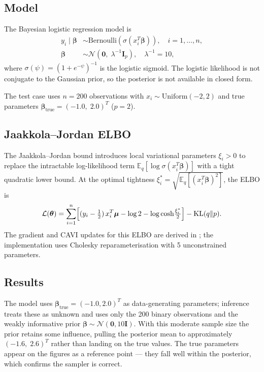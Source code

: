 \documentclass[11pt,a4paper]{article}
\newcommand{\E}{\mathbb{E}}
\newcommand{\N}{\mathcal{N}}
\begin{document}
\subsection{Model}

The Bayesian logistic regression model is
\begin{align}
  y_i \mid \bm{\beta} &\sim \mathrm{Bernoulli}(\sigma(x_i^T\bm{\beta})),
  \quad i = 1,\ldots,n, \\
  \bm{\beta} &\sim \N(\bm{0},\; \lambda^{-1}\bm{I}_p),
  \quad \lambda^{-1} = 10,
\end{align}
where $\sigma(\psi) = (1+e^{-\psi})^{-1}$ is the logistic sigmoid.
The logistic likelihood is not conjugate to the Gaussian prior, so the posterior is not
available in closed form.

The test case uses $n=200$ observations with $x_i \sim \mathrm{Uniform}(-2,2)$ and
true parameters $\bm{\beta}_{\mathrm{true}} = (-1.0,\; 2.0)^T$ ($p=2$).

\subsection{Jaakkola--Jordan ELBO}

The Jaakkola--Jordan bound \parencite{Jaakkola2000} introduces local variational
parameters $\xi_i > 0$ to replace the intractable log-likelihood term
$\E_q[\log\sigma(x_i^T\bm{\beta})]$ with a tight quadratic lower bound.
At the optimal tightness $\xi_i^* = \sqrt{\E_q[(x_i^T\bm{\beta})^2]}$, the ELBO is
\begin{equation}
  \mathcal{L}(\bm{\theta})
  = \sum_{i=1}^{n}
    \Bigl[(y_i - \tfrac{1}{2})\,x_i^T\bm{\mu}
          - \log 2 - \log\cosh\!\tfrac{\xi_i^*}{2}\Bigr]
  - \mathrm{KL}(q\|p).
\end{equation}
The gradient and CAVI updates for this ELBO are derived in \textcite{Jaakkola2000};
the implementation uses Cholesky reparameterisation with 5 unconstrained parameters.

\subsection{Results}

The model uses $\bm{\beta}_{\mathrm{true}} = (-1.0, 2.0)^T$ as data-generating
parameters; inference treats these as unknown and uses only the 200 binary observations
and the weakly informative prior $\bm{\beta}\sim\N(\bm{0},10\bm{I})$.
With this moderate sample size the prior retains some influence, pulling the posterior
mean to approximately $(-1.6,\;2.6)^T$ rather than landing on the true values.
The true parameters appear on the figures as a reference point --- they fall well within
the posterior, which confirms the sampler is correct.
\end{document}
